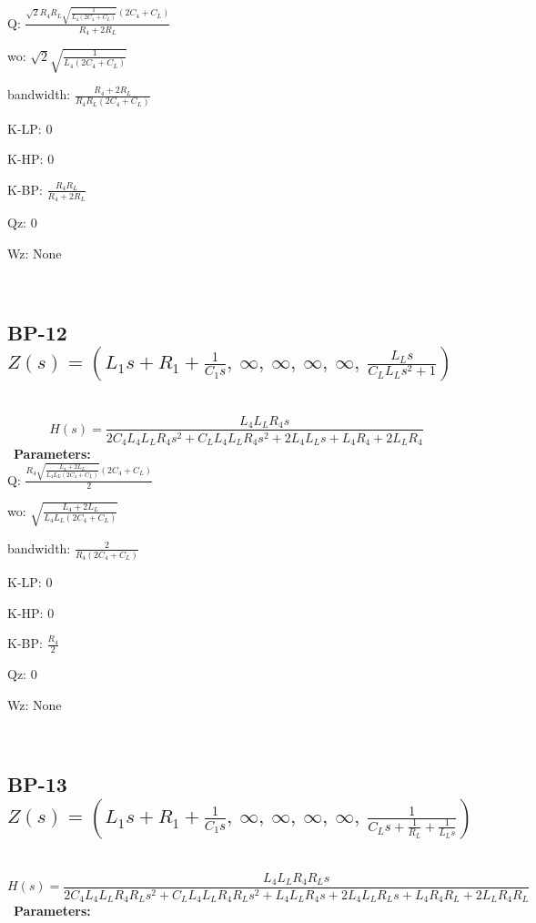 \documentclass{article}
\begin{document}
Q: $\frac{\sqrt{2} R_{4} R_{L} \sqrt{\frac{1}{L_{4} \left(2 C_{4} + C_{L}\right)}} \left(2 C_{4} + C_{L}\right)}{R_{4} + 2 R_{L}}$\ 

wo: $\sqrt{2} \sqrt{\frac{1}{L_{4} \left(2 C_{4} + C_{L}\right)}}$\ 

bandwidth: $\frac{R_{4} + 2 R_{L}}{R_{4} R_{L} \left(2 C_{4} + C_{L}\right)}$\ 

K-LP: $0$\ 

K-HP: $0$\ 

K-BP: $\frac{R_{4} R_{L}}{R_{4} + 2 R_{L}}$\ 

Qz: $0$\ 

Wz: $\text{None}$\ 

\ 

\subsection{BP-12 $Z(s) = \left( L_{1} s + R_{1} + \frac{1}{C_{1} s}, \  \infty, \  \infty, \  \infty, \  \infty, \  \frac{L_{L} s}{C_{L} L_{L} s^{2} + 1}\right)$ } \ 
\textbf{\[H(s) = \frac{L_{4} L_{L} R_{4} s}{2 C_{4} L_{4} L_{L} R_{4} s^{2} + C_{L} L_{4} L_{L} R_{4} s^{2} + 2 L_{4} L_{L} s + L_{4} R_{4} + 2 L_{L} R_{4}}\] } \ 
\textbf{Parameters:}\\ 

Q: $\frac{R_{4} \sqrt{\frac{L_{4} + 2 L_{L}}{L_{4} L_{L} \left(2 C_{4} + C_{L}\right)}} \left(2 C_{4} + C_{L}\right)}{2}$\ 

wo: $\sqrt{\frac{L_{4} + 2 L_{L}}{L_{4} L_{L} \left(2 C_{4} + C_{L}\right)}}$\ 

bandwidth: $\frac{2}{R_{4} \left(2 C_{4} + C_{L}\right)}$\ 

K-LP: $0$\ 

K-HP: $0$\ 

K-BP: $\frac{R_{4}}{2}$\ 

Qz: $0$\ 

Wz: $\text{None}$\ 

\ 

\subsection{BP-13 $Z(s) = \left( L_{1} s + R_{1} + \frac{1}{C_{1} s}, \  \infty, \  \infty, \  \infty, \  \infty, \  \frac{1}{C_{L} s + \frac{1}{R_{L}} + \frac{1}{L_{L} s}}\right)$ } \ 
\textbf{\[H(s) = \frac{L_{4} L_{L} R_{4} R_{L} s}{2 C_{4} L_{4} L_{L} R_{4} R_{L} s^{2} + C_{L} L_{4} L_{L} R_{4} R_{L} s^{2} + L_{4} L_{L} R_{4} s + 2 L_{4} L_{L} R_{L} s + L_{4} R_{4} R_{L} + 2 L_{L} R_{4} R_{L}}\] } \ 
\textbf{Parameters:}\\ 
\end{document}
